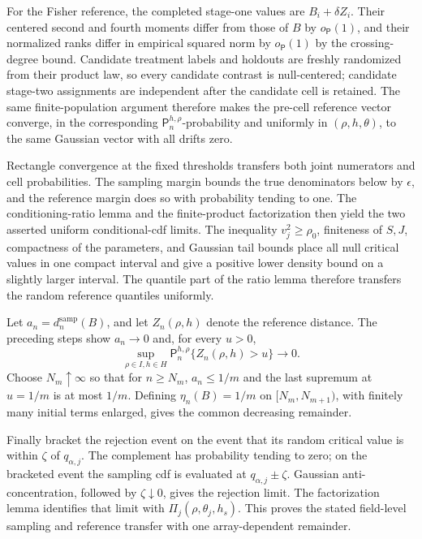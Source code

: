 For the Fisher reference, the completed stage-one values are \(B_i+\delta Z_i\).  Their centered second and fourth moments differ from those of \(B\) by \(o_{\mathsf P}(1)\), and their normalized ranks differ in empirical squared norm by \(o_{\mathsf P}(1)\) by the crossing-degree bound.  Candidate treatment labels and holdouts are freshly randomized from their product law, so every candidate contrast is null-centered; candidate stage-two assignments are independent after the candidate cell is retained.  The same finite-population argument therefore makes the pre-cell reference vector converge, in the corresponding \(\mathsf P_n^{h,\rho}\)-probability and uniformly in \((\rho,h,\theta)\), to the same Gaussian vector with all drifts zero.

Rectangle convergence at the fixed thresholds transfers both joint numerators and cell probabilities.  The sampling margin bounds the true denominators below by \(\epsilon\), and the reference margin does so with probability tending to one.  The conditioning-ratio lemma and the finite-product factorization then yield the two asserted uniform conditional-cdf limits.  The inequality \(v_j^2\ge\rho_0\), finiteness of \(S,J\), compactness of the parameters, and Gaussian tail bounds place all null critical values in one compact interval and give a positive lower density bound on a slightly larger interval.  The quantile part of the ratio lemma therefore transfers the random reference quantiles uniformly.

Let \(a_n=d_n^{\mathrm{samp}}(B)\), and let \(Z_n(\rho,h)\) denote the reference distance.  The preceding steps show \(a_n\to0\) and, for every \(u>0\),
\[
\sup_{\rho\in I,h\in H}\mathsf P_n^{h,\rho}\{Z_n(\rho,h)>u\}\to0.
\]
Choose \(N_m\uparrow\infty\) so that for \(n\ge N_m\), \(a_n\le1/m\) and the last supremum at \(u=1/m\) is at most \(1/m\).  Defining \(\eta_n(B)=1/m\) on \([N_m,N_{m+1})\), with finitely many initial terms enlarged, gives the common decreasing remainder.

Finally bracket the rejection event on the event that its random critical value is within \(\zeta\) of \(q_{\alpha,j}\).  The complement has probability tending to zero; on the bracketed event the sampling cdf is evaluated at \(q_{\alpha,j}\pm\zeta\).  Gaussian anti-concentration, followed by \(\zeta\downarrow0\), gives the rejection limit.  The factorization lemma identifies that limit with \(\Pi_j(\rho,\theta_j,h_s)\).  This proves the stated field-level sampling and reference transfer with one array-dependent remainder.

